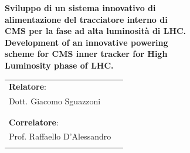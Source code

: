 \begin{titlepage}
\begin{center}
\begin{minipage}{\textwidth}
\begin{minipage}{0.4\textwidth}
\begin{flushright}
      \end{flushright}
    \end{minipage}
  \end{minipage}
  \vspace*{1.5cm}
  \vfill
  \begin{minipage}{0.8\textwidth}
  \begin{flushleft}
      {\large {\bf Sviluppo di un sistema innovativo di}} \\
      \vspace*{0.2cm}
      {\large {\bf alimentazione del tracciatore interno di}} \\
      \vspace*{0.2cm}
      {\large {\bf CMS per la fase ad alta luminosità di LHC.}} \\
      \vspace*{0.2cm}
    \vspace*{1cm}
    {\large {\bf Development of an innovative powering }} \\
    \vspace*{0.2cm}
    {\large {\bf scheme for CMS inner tracker for High}} \\
    \vspace*{0.2cm}
    {\large {\bf Luminosity phase of LHC.}}\\
   \vspace*{0.2cm}
    \vspace*{2cm}
    \begin{tabular}{l l}
      {\large \bf{Relatore}}: & {\large {\bf }}\\
      {\large Dott. Giacomo Sguazzoni} & {\large {\bf }}\\
      \\
      \\
      {\large \bf{Correlatore}}: & {\large{\bf }}\\
      {\large Prof. Raffaello D'Alessandro} & {\large {\bf }}\\
      \\

\end{tabular}
\end{flushleft}
\end{minipage}
\end{center}
\end{titlepage}
